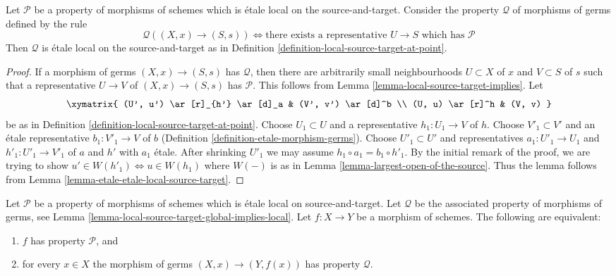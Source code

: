\begin{lemma}
\label{lemma-local-source-target-global-implies-local}
Let $\mathcal{P}$ be a property of morphisms of schemes
which is \'etale local on the source-and-target.
Consider the property $\mathcal{Q}$ of
morphisms of germs defined by the rule
$$
\mathcal{Q}((X, x) \to (S, s))
\Leftrightarrow
\text{there exists a representative }U \to S
\text{ which has }\mathcal{P}
$$
Then $\mathcal{Q}$ is \'etale local on the source-and-target as in
Definition \ref{definition-local-source-target-at-point}.
\end{lemma}

\begin{proof}
If a morphism of germs $(X, x) \to (S, s)$ has $\mathcal{Q}$,
then there are arbitrarily small neighbourhoods
$U \subset X$ of $x$ and $V \subset S$ of $s$
such that a representative $U \to V$ of $(X, x) \to (S, s)$ has $\mathcal{P}$.
This follows from Lemma \ref{lemma-local-source-target-implies}. Let
$$
\xymatrix{
(U', u') \ar[r]_{h'} \ar[d]_a & (V', v') \ar[d]^b \\
(U, u) \ar[r]^h & (V, v)
}
$$
be as in Definition \ref{definition-local-source-target-at-point}.
Choose $U_1 \subset U$ and a representative $h_1 : U_1 \to V$ of $h$.
Choose $V'_1 \subset V'$ and an \'etale representative $b_1 : V'_1 \to V$
of $b$ (Definition \ref{definition-etale-morphism-germs}).
Choose $U'_1 \subset U'$ and representatives $a_1 : U'_1 \to U_1$
and $h'_1 : U'_1 \to V'_1$ of $a$ and $h'$ with $a_1$ \'etale.
After shrinking $U'_1$ we may assume $h_1 \circ a_1 = b_1 \circ h'_1$.
By the initial remark of the proof, we are trying to show
$u' \in W(h'_1) \Leftrightarrow u \in W(h_1)$ where $W(-)$ is as
in Lemma \ref{lemma-largest-open-of-the-source}.
Thus the lemma follows from Lemma \ref{lemma-etale-etale-local-source-target}.
\end{proof}

\begin{lemma}
\label{lemma-local-source-target-local-implies-global}
Let $\mathcal{P}$ be a property of morphisms of schemes which is
\'etale local on source-and-target. Let $\mathcal{Q}$ be the associated property
of morphisms of germs, see
Lemma \ref{lemma-local-source-target-global-implies-local}.
Let $f : X \to Y$ be a morphism
of schemes. The following are equivalent:
\begin{enumerate}
\item $f$ has property $\mathcal{P}$, and
\item for every $x \in X$ the morphism of germs $(X, x) \to (Y, f(x))$
has property $\mathcal{Q}$.
\end{enumerate}
\end{lemma}


